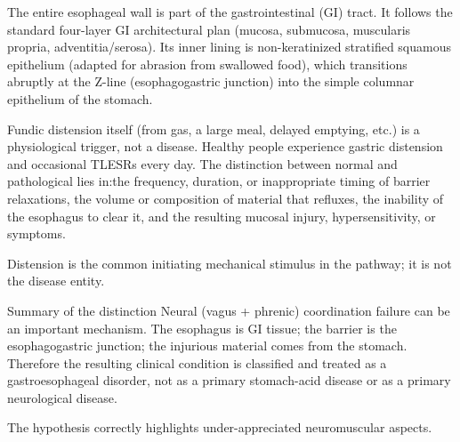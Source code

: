 The entire esophageal wall is part of the gastrointestinal (GI) tract. It follows the standard four-layer GI architectural plan (mucosa, submucosa, muscularis propria, adventitia/serosa). Its inner lining is non-keratinized stratified squamous epithelium (adapted for abrasion from swallowed food), which transitions abruptly at the Z-line (esophagogastric junction) into the simple columnar epithelium of the stomach. 

Fundic distension itself (from gas, a large meal, delayed emptying, etc.) is a physiological trigger, not a disease. Healthy people experience gastric distension and occasional TLESRs every day. The distinction between normal and pathological lies in:the frequency, duration, or inappropriate timing of barrier relaxations,
the volume or composition of material that refluxes,
the inability of the esophagus to clear it,
and the resulting mucosal injury, hypersensitivity, or symptoms.

Distension is the common initiating mechanical stimulus in the pathway; it is not the disease entity.

Summary of the distinction
Neural (vagus + phrenic) coordination failure can be an important mechanism.
The esophagus is GI tissue; the barrier is the esophagogastric junction; the injurious material comes from the stomach.
Therefore the resulting clinical condition is classified and treated as a gastroesophageal disorder, not as a primary stomach-acid disease or as a primary neurological disease.

The hypothesis correctly highlights under-appreciated neuromuscular aspects. 
